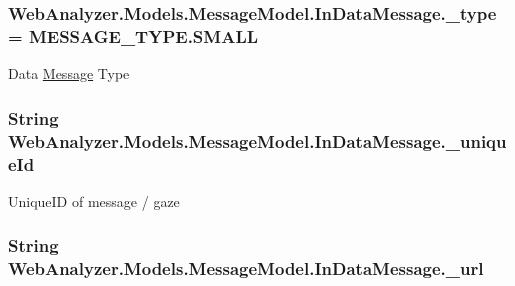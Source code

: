 \subsubsection[{\+\_\+type}]{ Web\+Analyzer.\+Models.\+Message\+Model.\+In\+Data\+Message.\+\_\+type = {\bf M\+E\+S\+S\+A\+G\+E\+\_\+\+T\+Y\+P\+E.\+S\+M\+A\+L\+L}\hspace{0.3cm}{\ttfamily [private]}}\label{class_web_analyzer_1_1_models_1_1_message_model_1_1_in_data_message_a4ec7837996a85d6843efb68bb7a7212f}


Data \hyperlink{class_web_analyzer_1_1_models_1_1_message_model_1_1_message}{Message} Type 

\hypertarget{class_web_analyzer_1_1_models_1_1_message_model_1_1_in_data_message_a65f5749322bf4e7ac43c6a4bf2702a55}{}
\subsubsection[{\+\_\+unique\+Id}]{\setlength{\rightskip}{0pt plus 5cm}String Web\+Analyzer.\+Models.\+Message\+Model.\+In\+Data\+Message.\+\_\+unique\+Id\hspace{0.3cm}{\ttfamily [private]}}\label{class_web_analyzer_1_1_models_1_1_message_model_1_1_in_data_message_a65f5749322bf4e7ac43c6a4bf2702a55}


Unique\+I\+D of message / gaze 

\hypertarget{class_web_analyzer_1_1_models_1_1_message_model_1_1_in_data_message_a8043e2e1b5fabe11fdcfe0c5dc2fee68}{}
\subsubsection[{\+\_\+url}]{\setlength{\rightskip}{0pt plus 5cm}String Web\+Analyzer.\+Models.\+Message\+Model.\+In\+Data\+Message.\+\_\+url\hspace{0.3cm}{\ttfamily [private]}}\label{class_web_analyzer_1_1_models_1_1_message_model_1_1_in_data_message_a8043e2e1b5fabe11fdcfe0c5dc2fee68}



